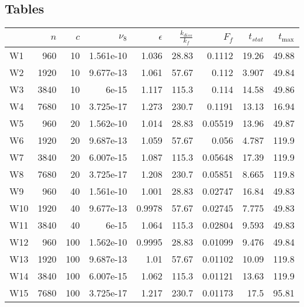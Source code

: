 \documentclass[a4paper]{article}
\begin{document}
\subsection{Tables}
\begin{tabular}{lrrrrrrrr}
\toprule
{} &   $n$ &  $c$ &   $\nu_8$ &  $\epsilon$ &  $\frac{k_{diss}}{k_f}$ &    $F_f$ &  $t_{stat}$ &  $t_{\max}$ \\
\midrule
W1  &   960 &   10 & 1.561e-10 &       1.036 &                   28.83 &   0.1112 &       19.26 &       49.88 \\
W2  &  1920 &   10 & 9.677e-13 &       1.061 &                   57.67 &    0.112 &       3.907 &       49.84 \\
W3  &  3840 &   10 &     6e-15 &       1.117 &                   115.3 &    0.114 &       14.58 &       49.86 \\
W4  &  7680 &   10 & 3.725e-17 &       1.273 &                   230.7 &   0.1191 &       13.13 &       16.94 \\
W5  &   960 &   20 & 1.562e-10 &       1.014 &                   28.83 &  0.05519 &       13.96 &       49.87 \\
W6  &  1920 &   20 & 9.687e-13 &       1.059 &                   57.67 &    0.056 &       4.787 &       119.9 \\
W7  &  3840 &   20 & 6.007e-15 &       1.087 &                   115.3 &  0.05648 &       17.39 &       119.9 \\
W8  &  7680 &   20 & 3.725e-17 &       1.208 &                   230.7 &  0.05851 &       8.665 &       119.8 \\
W9  &   960 &   40 & 1.561e-10 &       1.001 &                   28.83 &  0.02747 &       16.84 &       49.83 \\
W10 &  1920 &   40 & 9.677e-13 &      0.9978 &                   57.67 &  0.02745 &       7.775 &       49.83 \\
W11 &  3840 &   40 &     6e-15 &       1.064 &                   115.3 &  0.02804 &       9.593 &       49.83 \\
W12 &   960 &  100 & 1.562e-10 &      0.9995 &                   28.83 &  0.01099 &       9.476 &       49.84 \\
W13 &  1920 &  100 & 9.687e-13 &        1.01 &                   57.67 &  0.01102 &       10.09 &       119.8 \\
W14 &  3840 &  100 & 6.007e-15 &       1.062 &                   115.3 &  0.01121 &       13.63 &       119.9 \\
W15 &  7680 &  100 & 3.725e-17 &       1.217 &                   230.7 &  0.01173 &        17.5 &       95.81 \\

\end{tabular}
\end{document}
